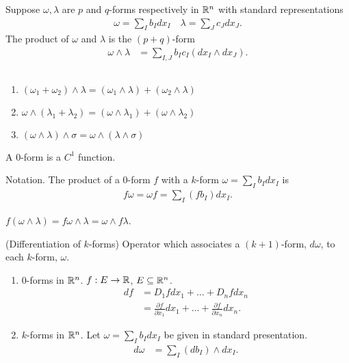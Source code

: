 \documentclass[11pt]{article}
\begin{document}
Suppose $\omega, \lambda$ are $p$ and $q$-forms respectively in $\mathbb{R}^n$ with standard representations \begin{align*} \omega = \sum_I b_I dx_I \quad \lambda = \sum_J c_J dx_J.
\end{align*} The product of $\omega$ and $\lambda$ is the $(p + q)$-form \begin{align*} \omega \wedge \lambda & = \sum_{I, J} b_I c_I (dx_I \wedge dx_J).
\end{align*}

\begin{remark} $\text{}$ \begin{enumerate}
  \item $(\omega_1 + \omega_2) \wedge \lambda = (\omega_1 \wedge \lambda) + (\omega_2 \wedge \lambda)$
  \item $\omega \wedge (\lambda_1 + \lambda_2) = (\omega \wedge \lambda_1) + (\omega \wedge \lambda_2)$
    \item $(\omega \wedge \lambda) \wedge \sigma = \omega \wedge (\lambda \wedge \sigma)$
  \end{enumerate}
\end{remark}

\begin{definition} A $0$-form is a $C^1$ function.
\end{definition}

Notation. The product of a $0$-form $f$ with a $k$-form $\omega = \sum_I b_I dx_I$ is \begin{align*} f \omega = \omega f = \sum_I (fb_I) dx_I.
\end{align*}

\begin{remark} $f ( \omega \wedge \lambda) = f \omega \wedge \lambda = \omega \wedge f \lambda $.
\end{remark}

\begin{definition} (Differentiation of $k$-forms) Operator which associates a $(k + 1)$-form, $d \omega$, to each $k$-form, $\omega$.
\begin{enumerate}
  \item $0$-forms in $\mathbb{R}^n$. $f: E \to \mathbb{R}$, $E \subseteq \mathbb{R}^n$. \begin{align*} df & = D_1 fdx_1 + \dots + D_n f dx_n  \\ & = \frac{\partial f}{\partial x_1} dx_1 + \dots + \frac{\partial f}{\partial x_n} dx_n.
  \end{align*}
  \item $k$-forms in $\mathbb{R}^n$. Let $\omega = \sum_I b_I dx_I$ be given in standard presentation. \begin{align*} d \omega & = \sum_I (db_I) \wedge dx_I.
  \end{align*}
\end{enumerate}
\end{definition}
\end{document}
